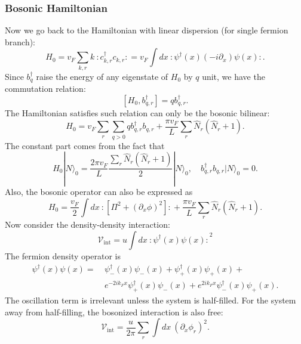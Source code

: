 \subsubsection{Bosonic Hamiltonian}
Now we go back to the Hamiltonian with linear dispersion (for single fermion branch):
\begin{equation}
	H_0 = v_F \sum_{k,r} k\ {:\mathrel{c_{k,r}^\dagger c_{k,r}}:} 
	= v_F \int dx\ {:\mathrel{\psi^\dagger(x)(-i\partial_x)\psi(x)}:}.
\end{equation}
Since $b_q^\dagger$ raise the energy of any eigenstate of $H_0$ by $q$ unit, we have the commutation relation:
\begin{equation}
	\left[H_0,b_{q,r}^\dagger\right] = q b_{q,r}^\dagger.
\end{equation}
The Hamiltonian satisfies such relation can only be the bosonic bilinear:
\begin{equation}
	H_0 = v_F \sum_{r}\sum_{q>0} q b_{q,r}^\dagger b_{q,r} + \frac{\pi v_F}{L} \sum_r \hat{N}_r(\hat{N}_r+1).
\end{equation}
The constant part comes from the fact that
\begin{equation}
	H_0|N\rangle_0 = \frac{2\pi v_F}{L} \frac{\sum_r\hat{N}_r(\hat{N}_r+1)}{2}|N\rangle_0, \quad
	b_{q,r}^\dagger b_{q,r} |N\rangle_0 = 0.
\end{equation}
Also, the bosonic operator can also be expressed as
\begin{equation}
	H_0 = \frac{v_F}{2} \int dx\ {:\mathrel{\left[\Pi^2 + (\partial_x \phi)^2\right]}:} + \frac{\pi v_F}{L}\sum_r \hat{N}_r(\hat{N}_r+1).
\end{equation}
Now consider the density-density interaction:
\begin{equation}
	\mathcal V_{\mathrm{int}} = u \int dx\ {:\mathrel{\psi^\dagger(x)\psi(x)}:}^2
\end{equation}
The fermion density operator is
\begin{equation}
\begin{aligned}
	\psi^\dagger(x)\psi(x) =&\ \psi_-^\dagger(x)\psi_-(x) + \psi_+^\dagger(x)\psi_+(x) + \\
	&\ e^{-2ik_F x} \psi_+^\dagger(x)\psi_-(x)+e^{2ik_F x}\psi_-^\dagger(x)\psi_+(x).
\end{aligned}
\end{equation}
The oscillation term is irrelevant unless the system is half-filled.
For the system away from half-filling, the bosonized interaction is also free:
\begin{equation}
	\mathcal V_\mathrm{int} = \frac{u}{2\pi}\sum_r \int dx\ (\partial_x\phi_r)^2.
\end{equation}

